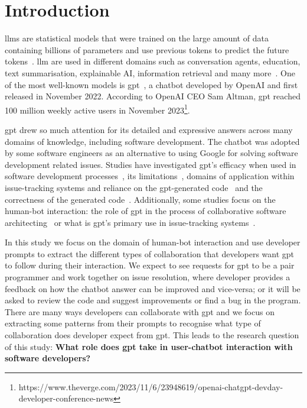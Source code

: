 \chapter{Introduction}\label{introduction}

\glspl{llm} are statistical models that were trained on the large amount of data containing billions of parameters and use previous tokens to predict the future tokens~\cite{gpt-usage-and-lim}. \gls{llm} are used in different domains such as conversation agents, education, text summarisation, explainable AI, information retrieval and many more~\cite{Dale_2021}. One of the most well-known models is \gls{gpt}~\cite{Floridi2020-gpt3paper}, a chatbot developed by OpenAI and first released in November 2022. According to OpenAI CEO Sam Altman, \gls{gpt} reached 100 million weekly active users in November 2023\footnote{https://www.theverge.com/2023/11/6/23948619/openai-chatgpt-devday-developer-conference-news}. 

\gls{gpt} drew so much attention for its detailed and
expressive answers across many domains of knowledge, including software development. The chatbot was adopted by some software engineers as an alternative to using Google for solving software development related issues. Studies have investigated \gls{gpt}'s efficacy when used in software development processes~\cite{Hörnemalm_2023}, its limitations~\cite{gpt-usage-and-lim}, domains of application within issue-tracking systems and reliance on the \gls{gpt}-generated code~\cite{gpt-issue-tracking} and the correctness of the generated code~\cite{gpt-code-correctness, zhang2023critical}. Additionally, some studies focus on the human-bot interaction: the role of
\gls{gpt} in the process of collaborative software architecting~\cite{gpt-software-architecture} or what is \gls{gpt}'s primary use in issue-tracking systems~\cite{gpt-issue-tracking}. 

In this study we focus on the domain of human-bot interaction and use developer prompts to extract the different types of collaboration that developers want \gls{gpt} to follow during their interaction. We expect to see requests for \gls{gpt} to be a pair programmer and work together on issue resolution, where developer provides a feedback on how the chatbot answer can be improved and vice-versa; or it will be asked to review the code and suggest improvements or find a bug in the program. There are many ways developers can collaborate with \gls{gpt} and we focus on extracting some patterns from their prompts to recognise what type of collaboration does developer expect from \gls{gpt}. This leads to the research question of this study: \textbf{What role does \gls{gpt} take in user-chatbot interaction with software developers?}

